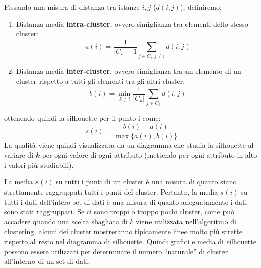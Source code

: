 Fissando una misura di distanza tra istanze $i, j$ ($d(i, j)$), definiremo:
\begin{enumerate}
      \item Distanza media \textbf{intra-cluster}, ovvero simiglianza tra
            elementi dello stesso cluster:
            \begin{equation}
                  a(i) = \frac{1}{|C_i| - 1} \sum_{j \in C_i, j \neq i} d(i, j)
            \end{equation}
      \item Distanza media \textbf{inter-cluster}, ovvero simiglianza tra un
            elemento di un cluster rispetto a tutti gli elementi tra gli altri
            cluster:
            \begin{equation}
                  b(i) = \min_{k \neq i} \frac{1}{|C_k|} \sum_{j \in C_k} d(i, j)
            \end{equation}
\end{enumerate}
ottenendo quindi la silhouette per il punto i come:
\begin{equation}
      s(i) = \frac{b(i) - a(i)}{\max\{a(i), b(i)\}}
\end{equation}
La qualità viene quindi visualizzata da un diagramma che studia la silhouette al
variare di $k$ per ogni valore di ogni attributo (mettendo per ogni attributo in
alto i valori più studiabili).

La media $s(i)$ su tutti i punti di un cluster è una misura di quanto siano
strettamente raggruppati tutti i punti del cluster. Pertanto, la media $s(i)$ su
tutti i dati dell'intero set di dati è una misura di quanto adeguatamente i dati
sono stati raggruppati. Se ci sono troppi o troppo pochi cluster, come può
accadere quando una scelta sbagliata di $k$ viene utilizzata nell'algoritmo di
clustering, alcuni dei cluster mostreranno tipicamente linee molto più strette
rispetto al resto nel diagramma di silhouette. Quindi grafici e media di
silhouette possono essere utilizzati per determinare il numero “naturale” di
cluster all'interno di un set di dati.